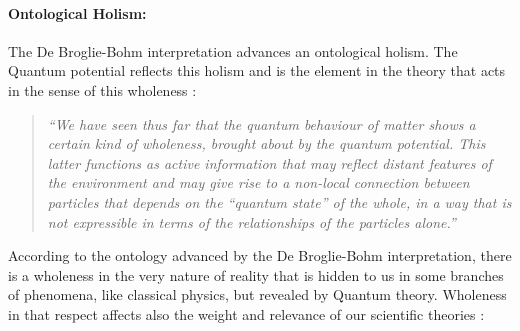 \documentclass{article}
\begin{document}
%
%
%

\paragraph{Ontological Holism:}

The De Broglie-Bohm interpretation advances an ontological holism. The Quantum potential reflects this holism and is the element in the theory that acts in the sense of this wholeness \cite[p.340]{bohm1987ontological}: 

\begin{quote}
\textit{``We have seen thus far that the quantum behaviour of matter shows a certain kind of wholeness, brought about by the quantum potential. This latter functions as active information that may reflect distant features of the environment and may give rise to a non-local connection between particles that depends on the “quantum state” of the whole, in a way that is not expressible in terms of the relationships of the particles alone.''}
\end{quote}

According to the ontology advanced by the De Broglie-Bohm interpretation, there is a wholeness in the very nature of reality that is hidden to us in some branches of phenomena, like classical physics, but revealed by Quantum theory. Wholeness in that respect affects also the weight and relevance of our scientific theories \cite[p.21-p.22]{bohm1981wholeness}:
\end{document}
